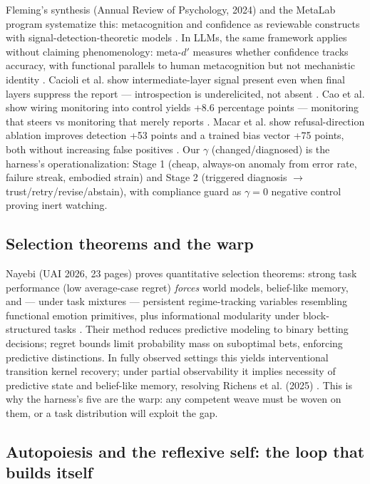 \documentclass[11pt]{article}
\begin{document}
Fleming's synthesis (Annual Review of Psychology, 2024) and the MetaLab program systematize this: metacognition and confidence as reviewable constructs with signal-detection-theoretic models \citep{maniscalco2012}. In LLMs, the same framework applies without claiming phenomenology: meta-$d'$ measures whether confidence tracks accuracy, with functional parallels to human metacognition but not mechanistic identity \citep{cacioli2026}. Cacioli et al. show intermediate-layer signal present even when final layers suppress the report --- introspection is underelicited, not absent \citep{cacioli2026}. Cao et al. show wiring monitoring into control yields +8.6 percentage points --- monitoring that steers vs monitoring that merely reports \citep{cao2026}. Macar et al. show refusal-direction ablation improves detection +53 points and a trained bias vector +75 points, both without increasing false positives \citep{macar2026}. Our $\gamma$ (changed/diagnosed) is the harness's operationalization: Stage 1 (cheap, always-on anomaly from error rate, failure streak, embodied strain) and Stage 2 (triggered diagnosis $\to$ trust/retry/revise/abstain), with compliance guard as $\gamma=0$ negative control proving inert watching.

\subsection{Selection theorems and the warp}

Nayebi (UAI 2026, 23 pages) proves quantitative selection theorems: strong task performance (low average-case regret) \emph{forces} world models, belief-like memory, and --- under task mixtures --- persistent regime-tracking variables resembling functional emotion primitives, plus informational modularity under block-structured tasks \citep{nayebi2026}. Their method reduces predictive modeling to binary betting decisions; regret bounds limit probability mass on suboptimal bets, enforcing predictive distinctions. In fully observed settings this yields interventional transition kernel recovery; under partial observability it implies necessity of predictive state and belief-like memory, resolving Richens et al. (2025) \citep{nayebi2026}. This is why the harness's five are the warp: any competent weave must be woven on them, or a task distribution will exploit the gap.

\subsection{Autopoiesis and the reflexive self: the loop that builds itself}
\end{document}
